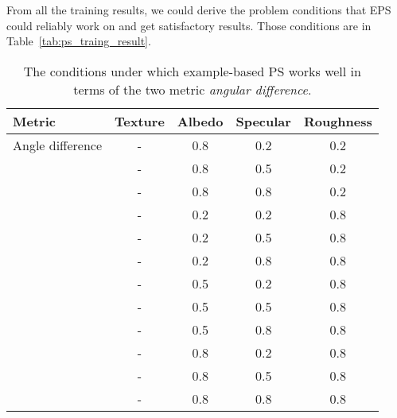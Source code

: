 From all the training results, we could derive the problem conditions that EPS could reliably work on and get satisfactory results. Those conditions are in Table~\ref{tab:ps_traing_result}.
\begin{table}[!htbp]
  \centering
  \begin{tabular}{l*{4}{c}}
  \hline
  \textbf{Metric} & Texture & Albedo & Specular & Roughness\\
  \hline
  Angle difference & - & 0.8 & 0.2 & 0.2\\
                   & - & 0.8 & 0.5 & 0.2\\
                   & - & 0.8 & 0.8 & 0.2\\
                   & - & 0.2 & 0.2 & 0.8\\
                   & - & 0.2 & 0.5 & 0.8\\
                   & - & 0.2 & 0.8 & 0.8\\
                   & - & 0.5 & 0.2 & 0.8\\
                   & - & 0.5 & 0.5 & 0.8\\
                   & - & 0.5 & 0.8 & 0.8\\
                   & - & 0.8 & 0.2 & 0.8\\
                   & - & 0.8 & 0.5 & 0.8\\
                   & - & 0.8 & 0.8 & 0.8\\
  \hline
  \end{tabular}
  \caption{The conditions under which example-based PS works well in terms of the two metric \textit{angular difference}.}
  \label{tab:ps_training_result}
\end{table}

